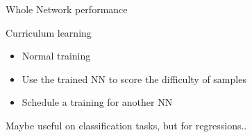 \documentclass{beamer}
\begin{document}
\begin{frame}{Whole Network performance}

    
\end{frame}

\begin{frame}{Curriculum learning}
    \begin{itemize}
        \item Normal training
        \item Use the trained NN to score the difficulty of samples
        \item Schedule a training for another NN
    \end{itemize}
    \vfill
    Maybe useful on classification tasks, but for regressions..
\end{frame}
\end{document}
